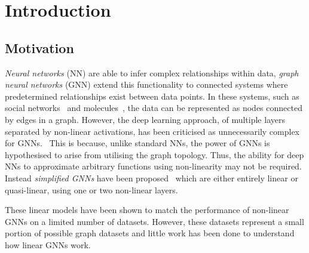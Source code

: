 \section{Introduction}

\subsection{Motivation}
\label{sec:motivation}




\emph{Neural networks} (NN) are able to infer complex relationships within data, \emph{graph neural networks} (GNN) extend this functionality to connected systems where predetermined relationships exist between data points.
In these systems, such as social networks~\cite{pmlr-v70-gilmer17a} and molecules~\cite{DBLP:journals/corr/abs-1806-01973}, the data can be represented as nodes connected by edges in a graph.
However, the deep learning approach, of multiple layers separated by non-linear activations, has been criticised as unnecessarily complex for GNNs.~\cite{wu2019simplifying}
This is because, unlike standard NNs, the power of GNNs is hypothesised to arise from utilising the graph topology.
Thus, the ability for deep NNs to approximate arbitrary functions using non-linearity may not be required.
Instead \emph{simplified GNNs} have been proposed~\cite{chanpuriya2022simplified,chien2020adaptive,wu2019simplifying} which are either entirely linear or quasi-linear, using one or two non-linear layers.

%
These linear models have been shown to match the performance of non-linear GNNs on a limited number of datasets.
However, these datasets represent a small portion of possible graph datasets and little work has been done to understand how linear GNNs work.

